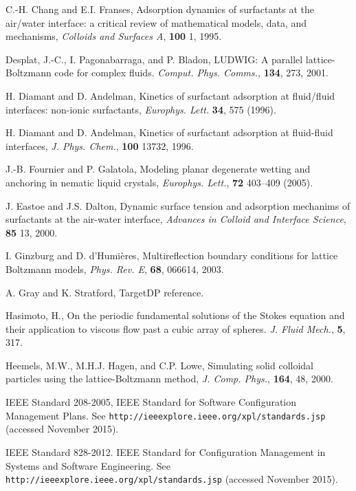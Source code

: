 \begin{thebibliography}{99}
C.-H. Chang and E.I. Franses,
Adsorption dynamics of surfactants at the air/water interface:
a critical review of mathematical models, data, and mechanisms,
\textit{Colloids and Surfaces A}, \textbf{100} 1, 1995.

Desplat, J.-C., I. Pagonabarraga, and P. Bladon,
LUDWIG: A parallel lattice-Boltzmann code for complex fluids.
\textit{Comput. Phys. Comms.}, \textbf{134}, 273, 2001.

H. Diamant and D. Andelman,
Kinetics of surfactant adsorption at fluid/fluid
interfaces: non-ionic surfactants,
\textit{Europhys. Lett.} \textbf{34}, 575 (1996).

H. Diamant and D. Andelman,
Kinetics of surfactant adsorption at fluid-fluid interfaces,
\textit{J. Phys. Chem.}, \textbf{100} 13732, 1996.

J.-B. Fournier and P. Galatola,
Modeling planar degenerate wetting and anchoring in nematic liquid
crystals,
\textit{Europhys. Lett.}, \textbf{72} 403--409 (2005).

J. Eastoe and J.S. Dalton,
Dynamic surface tension and adsorption mechanims of surfactants
at the air-water interface,
\textit{Advances in Colloid and Interface Science}, \textbf{85}
13, 2000.

I. Ginzburg and D. d'Humi\`eres,
Multireflection boundary conditions for lattice Boltzmann models,
\textit{Phys. Rev. E}, \textbf{68}, 066614, 2003.

A. Gray and K. Stratford,
TargetDP reference.

Hasimoto, H., On the periodic fundamental solutions of the Stokes
equation and their application to viscous flow past a cubic array
of spheres.
\textit{J. Fluid Mech.}, \textbf{5}, 317.

Heemels, M.W., M.H.J. Hagen, and C.P. Lowe, Simulating solid colloidal
particles using the lattice-Boltzmann method,
\textit{J. Comp. Phys.}, \textbf{164}, 48, 2000.

IEEE Standard 208-2005, IEEE Standard for Software Configuration Management
Plans.
See \texttt{http://ieeexplore.ieee.org/xpl/standards.jsp}
(accessed November 2015).

IEEE Standard 828-2012. IEEE Standard for Configuration
Management in Systems and Software Engineering. 
See \texttt{http://ieeexplore.ieee.org/xpl/standards.jsp}
(accessed November 2015).


\end{thebibliography}
